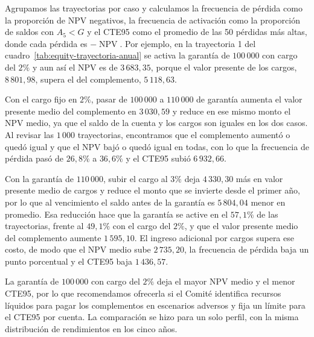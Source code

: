 Agrupamos las trayectorias por caso y calculamos la frecuencia de pérdida como la proporción de NPV negativos, la frecuencia de activación como la proporción de saldos con $A_5<G$ y el CTE95 como el promedio de las 50 pérdidas más altas, donde cada pérdida es $-\operatorname{NPV}$. Por ejemplo, en la trayectoria 1 del cuadro~\ref{tab:equity-trayectoria-anual} se activa la garantía de $100\,000$ con cargo del $2\%$ y aun así el NPV es de $3\,683{,}35$, porque el valor presente de los cargos, $8\,801{,}98$, supera el del complemento, $5\,118{,}63$.

Con el cargo fijo en $2\%$, pasar de $100\,000$ a $110\,000$ de garantía aumenta el valor presente medio del complemento en $3\,030{,}59$ y reduce en ese mismo monto el NPV medio, ya que el saldo de la cuenta y los cargos son iguales en los dos casos. Al revisar las $1\,000$ trayectorias, encontramos que el complemento aumentó o quedó igual y que el NPV bajó o quedó igual en todas, con lo que la frecuencia de pérdida pasó de $26{,}8\%$ a $36{,}6\%$ y el CTE95 subió $6\,932{,}66$.

Con la garantía de $110\,000$, subir el cargo al $3\%$ deja $4\,330{,}30$ más en valor presente medio de cargos y reduce el monto que se invierte desde el primer año, por lo que al vencimiento el saldo antes de la garantía es $5\,804{,}04$ menor en promedio. Esa reducción hace que la garantía se active en el $57{,}1\%$ de las trayectorias, frente al $49{,}1\%$ con el cargo del $2\%$, y que el valor presente medio del complemento aumente $1\,595{,}10$. El ingreso adicional por cargos supera ese costo, de modo que el NPV medio sube $2\,735{,}20$, la frecuencia de pérdida baja un punto porcentual y el CTE95 baja $1\,436{,}57$.

La garantía de $100\,000$ con cargo del $2\%$ deja el mayor NPV medio y el menor CTE95, por lo que recomendamos ofrecerla si el Comité identifica recursos líquidos para pagar los complementos en escenarios adversos y fija un límite para el CTE95 por cuenta. La comparación se hizo para un solo perfil, con la misma distribución de rendimientos en los cinco años.
